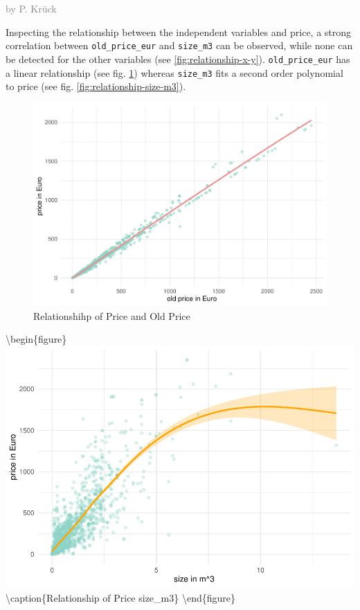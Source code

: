 \documentclass[a4paper, nobind]{templates/ociamthesis}
\begin{document}
\textcolor{gray}{by P. Krück}

Inspecting the relationship between the independent variables and price, a strong correlation between \texttt{old\_price\_eur} and \texttt{size\_m3} can be observed, while none can be detected for the other variables (see \ref{fig:relationship-x-y}).
\texttt{old\_price\_eur} has a linear relationship (see fig. \ref{fig:relationship-old-price}) whereas \texttt{size\_m3} fits a second order polynomial to price (see fig. \ref{fig:relationship-size-m3}).

\begin{figure}
\includegraphics[width=1\linewidth]{_main_files/figure-latex/relationship-old-price-1} \caption{Relationshihp of Price and Old Price}\label{fig:relationship-old-price}
\end{figure}

\textbackslash{}begin\{figure\}
\includegraphics[width=1\linewidth]{_main_files/figure-latex/relationship-size-m3-1} \textbackslash{}caption\{Relationship of Price size\_m3\}\label{fig:relationship-size-m3}
\textbackslash{}end\{figure\}
\end{document}
